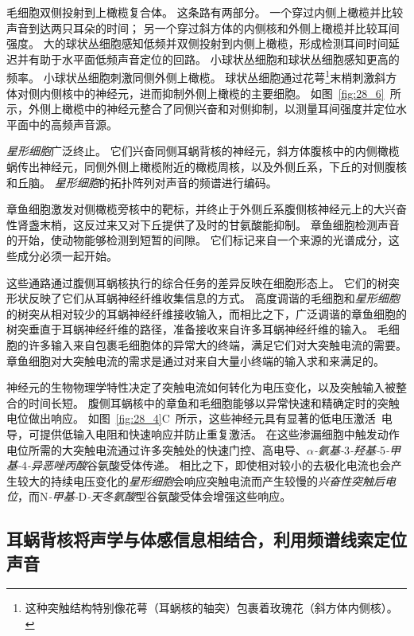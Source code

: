 毛细胞双侧投射到上橄榄复合体。
这条路有两部分。
一个穿过内侧上橄榄并比较声音到达两只耳朵的时间； 另一个穿过斜方体的内侧核和外侧上橄榄并比较耳间强度。
大的球状丛细胞感知低频并双侧投射到内侧上橄榄，形成检测耳间时间延迟并有助于水平面低频声音定位的回路。
小球状丛细胞和球状丛细胞感知更高的频率。
小球状丛细胞刺激同侧外侧上橄榄。
球状丛细胞通过花萼\footnote{这种突触结构特别像花萼（耳蜗核的轴突）包裹着玫瑰花（斜方体内侧核）。}末梢刺激斜方体对侧内侧核中的神经元，进而抑制外侧上橄榄的主要细胞。
如图~\ref{fig:28_6}~所示，外侧上橄榄中的神经元整合了同侧兴奋和对侧抑制，以测量耳间强度并定位水平面中的高频声音源。


\textit{星形细胞}广泛终止。
它们兴奋同侧耳蜗背核的神经元，斜方体腹核中的内侧橄榄蜗传出神经元，同侧外侧上橄榄附近的橄榄周核，以及外侧丘系，下丘的对侧腹核和丘脑。 
\textit{星形细胞}的拓扑阵列对声音的频谱进行编码。


章鱼细胞激发对侧橄榄旁核中的靶标，并终止于外侧丘系腹侧核神经元上的大兴奋性肾盏末梢，这反过来又对下丘提供了及时的甘氨酸能抑制。
章鱼细胞检测声音的开始，使动物能够检测到短暂的间隙。
它们标记来自一个来源的光谱成分，这些成分必须一起开始。


这些通路通过腹侧耳蜗核执行的综合任务的差异反映在细胞形态上。
它们的树突形状反映了它们从耳蜗神经纤维收集信息的方式。
高度调谐的毛细胞和\textit{星形细胞}的树突从相对较少的耳蜗神经纤维接收输入，而相比之下，广泛调谐的章鱼细胞的树突垂直于耳蜗神经纤维的路径，准备接收来自许多耳蜗神经纤维的输入。
毛细胞的许多输入来自包裹毛细胞体的异常大的终端，满足它们对大突触电流的需要。
章鱼细胞对大突触电流的需求是通过对来自大量小终端的输入求和来满足的。


神经元的生物物理学特性决定了突触电流如何转化为电压变化，以及突触输入被整合的时间长短。
腹侧耳蜗核中的章鱼和毛细胞能够以异常快速和精确定时的突触电位做出响应。
如图~\ref{fig:28_4}C~所示，这些神经元具有显著的低电压激活~电导，可提供低输入电阻和快速响应并防止重复激活。
在这些渗漏细胞中触发动作电位所需的大突触电流通过许多突触处的快速门控、高电导、\textit{$\alpha$-氨基-}3\textit{-羟基-}5\textit{-甲基-}4\textit{-异恶唑丙酸}谷氨酸受体传递。
相比之下，即使相对较小的去极化电流也会产生较大的持续电压变化的\textit{星形细胞}会响应突触电流而产生较慢的\textit{兴奋性突触后电位}，而N\textit{-甲基-}D\textit{-天冬氨酸}型谷氨酸受体会增强这些响应。



\subsection{耳蜗背核将声学与体感信息相结合，利用频谱线索定位声音}

